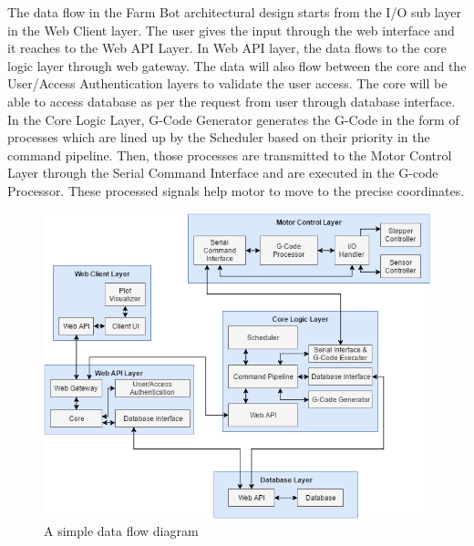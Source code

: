 The data flow in the Farm Bot architectural design starts from the I/O sub layer in the Web Client layer. The user gives the input through the web interface and it reaches to the Web API Layer. In Web API layer, the data flows to the core logic layer through web gateway. The data will also flow between the core and the User/Access Authentication layers to validate the user access. The core will be able to access database as per the request from user through database interface. In the Core Logic Layer, G-Code Generator generates the G-Code in the form of processes which are lined up by the Scheduler based on their priority in the command pipeline. Then, those processes are transmitted to the Motor Control Layer through the Serial Command Interface and are executed in the G-code Processor. These processed signals help motor to move to the precise coordinates.   

\begin{figure}[h!]
	\centering
 	\includegraphics[width=\textwidth]{images/data_flow}
 \caption{A simple data flow diagram}
\end{figure}
